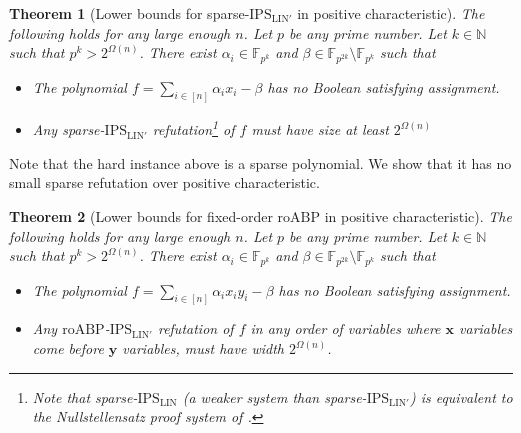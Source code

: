 \documentclass[11pt]{article}
\newtheorem{theorem}{Theorem}[section]
\newcommand{\F}{\mathbb{F}}
\newcommand{\comment}[2]{\marginpar{\tiny{\textbf{#1: }\textit{#2}}}}
\newcommand{\vr}[1]{\comment{VR}{#1}}
\newcommand{\ssr}[1]{\comment{SS}{#1}}
\newcommand{\IPSLIN}{\mathrm{IPS}_{\mathrm{LIN}}}
\newcommand{\IPSLINp}{\mathrm{IPS}_{\mathrm{LIN}'}}
\newcommand{\roABP}{\mathrm{roABP}}
\begin{document}
\begin{theorem}[Lower bounds for sparse-$\IPSLINp$ in positive characteristic]
    \label{thm:lbd-sparse}
    The following holds for any large enough $n$. Let $p$ be any prime number. Let $k \in \mathbb{N}$ such that $p^k > 2^{\Omega(n)}$. There exist $\alpha_{i}\in \F_{p^{k}}$ and $\beta \in \F_{p^{{{2k}}}}\setminus \F_{p^{k}}$ %
    such that 
    \begin{itemize}
        \item The polynomial $f = \sum_{i \in [n]}\alpha_{i} x_i - \beta$ has no Boolean satisfying assignment.
        \item Any sparse-$\IPSLINp$ refutation\footnote{Note that sparse-$\IPSLIN$ (a weaker system than sparse-$\IPSLINp$) is equivalent to the Nullstellensatz proof system of \cite{BIKPP94}.} of $f$ must have size at least $2^{\Omega(n)}$ 
    \end{itemize}
\end{theorem}
Note that the hard instance above is a sparse polynomial. We show that it has no small sparse refutation over positive characteristic. 

\begin{theorem}[Lower bounds for fixed-order $\roABP$ in positive characteristic]
    \label{thm:lbd-fixed-order-roabp}
    The following holds for any large enough $n$. Let $p$ be any prime number. Let $k \in \mathbb{N}$ such that $p^k > 2^{\Omega(n)}$.  There exist $\alpha_{i}\in \F_{p^k}$ and $\beta \in \F_{p^{2k}}\setminus \F_{p^k}$ such that 
    \begin{itemize}
        \item The polynomial $f = \sum_{i \in [n]}\alpha_{i} x_i y_i - \beta$ has no Boolean satisfying assignment.
        \item Any $\roABP$-$\IPSLINp$ refutation of $f$ in any order of variables where $\mathbf{x}$ variables come before $\mathbf{y}$ variables, must have width $2^{\Omega(n)}$. 
    \end{itemize}
\end{theorem}
\end{document}
